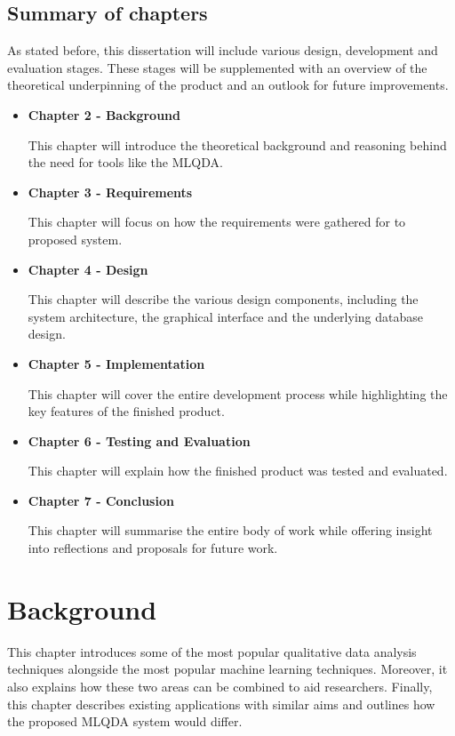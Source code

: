 \documentclass{l4proj}
\begin{document}
\section{Summary of chapters}
As stated before, this dissertation will include various design, development and evaluation stages. These stages will be supplemented with an overview of the theoretical underpinning of the product and an outlook for future improvements.
\begin{itemize}
    \item\textbf{Chapter 2 - Background}

    This chapter will introduce the theoretical background and reasoning behind the need for tools like the MLQDA.
    
    \item\textbf{Chapter 3 - Requirements}

    This chapter will focus on how the requirements were gathered for to proposed system.
    
    \item\textbf{Chapter 4 - Design}
    
    This chapter will describe the various design components, including the system architecture, the graphical interface and the underlying database design.
    
    \item\textbf{Chapter 5 - Implementation}
    
    This chapter will cover the entire development process while highlighting the key features of the finished product.
    \item\textbf{Chapter 6 - Testing and Evaluation}
    
    This chapter will explain how the finished product was tested and evaluated.
    \item\textbf{Chapter 7 - Conclusion}
    
    This chapter will summarise the entire body of work while offering insight into reflections and proposals for future work.
    

\end{itemize}


\chapter{Background}

This chapter introduces some of the most popular qualitative data analysis techniques alongside the most popular machine learning techniques. Moreover, it also explains how these two areas can be combined to aid researchers. Finally, this chapter describes existing applications with similar aims and outlines how the proposed MLQDA system would differ. 
\end{document}
